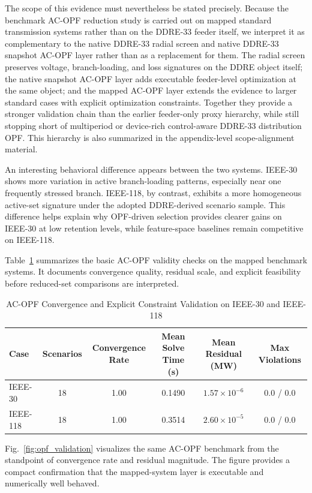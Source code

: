 \documentclass[journal]{IEEEtran}
\begin{document}
The scope of this evidence must nevertheless be stated precisely. Because the benchmark AC-OPF reduction study is carried out on mapped standard transmission systems rather than on the DDRE-33 feeder itself, we interpret it as complementary to the native DDRE-33 radial screen and native DDRE-33 snapshot AC-OPF layer rather than as a replacement for them. The radial screen preserves voltage, branch-loading, and loss signatures on the DDRE object itself; the native snapshot AC-OPF layer adds executable feeder-level optimization at the same object; and the mapped AC-OPF layer extends the evidence to larger standard cases with explicit optimization constraints. Together they provide a stronger validation chain than the earlier feeder-only proxy hierarchy, while still stopping short of multiperiod or device-rich control-aware DDRE-33 distribution OPF. This hierarchy is also summarized in the appendix-level scope-alignment material.

An interesting behavioral difference appears between the two systems. IEEE-30 shows more variation in active branch-loading patterns, especially near one frequently stressed branch. IEEE-118, by contrast, exhibits a more homogeneous active-set signature under the adopted DDRE-derived scenario sample. This difference helps explain why OPF-driven selection provides clearer gains on IEEE-30 at low retention levels, while feature-space baselines remain competitive on IEEE-118.

Table~\ref{tab:opf_case_summary} summarizes the basic AC-OPF validity checks on the mapped benchmark systems. It documents convergence quality, residual scale, and explicit feasibility before reduced-set comparisons are interpreted.

\begin{table}[!t]
\caption{AC-OPF Convergence and Explicit Constraint Validation on IEEE-30 and IEEE-118}
\label{tab:opf_case_summary}
\centering
\begin{tabular}{|l|c|c|c|c|c|}
\hline
Case & Scenarios & Convergence Rate & Mean Solve Time (s) & Mean Residual (MW) & Max Violations \\
\hline
IEEE-30 & 18 & 1.00 & 0.1490 & $1.57\times10^{-6}$ & 0.0 / 0.0 \\
IEEE-118 & 18 & 1.00 & 0.3514 & $2.60\times10^{-5}$ & 0.0 / 0.0 \\
\hline
\end{tabular}
\end{table}

Fig.~\ref{fig:opf_validation} visualizes the same AC-OPF benchmark from the standpoint of convergence rate and residual magnitude. The figure provides a compact confirmation that the mapped-system layer is executable and numerically well behaved.
\end{document}
